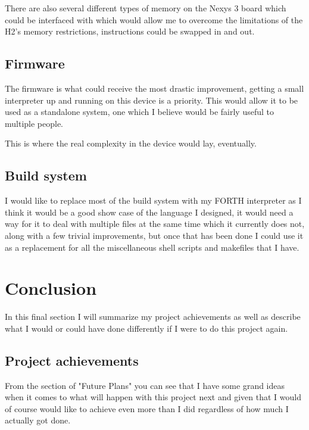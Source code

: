\documentclass	[a4paper, 10pt]	{article}
\begin{document}
      There are also several different types of memory on the Nexys 3 board
      which could be interfaced with which would allow me to overcome the
      limitations of the H2's memory restrictions, instructions could be swapped
      in and out.

    \subsection{Firmware}

    The firmware is what could receive the most drastic improvement, getting a small
    interpreter up and running on this device is a priority. This would allow it
    to be used as a standalone system, one which I believe would be fairly useful
    to multiple people. 

    This is where the real complexity in the device would lay, eventually.

    \subsection{Build system}

    I would like to replace most of the build system with my FORTH interpreter as I
    think it would be a good show case of the language I designed, it would need
    a way for it to deal with multiple files at the same time which it currently does
    not, along with a few trivial improvements, but once that has been done I could
    use it as a replacement for all the miscellaneous shell scripts and makefiles
    that I have.

  \section{Conclusion}

    In this final section I will summarize my project achievements as well as describe
    what I would or could have done differently if I were to do this project again.

    \subsection{Project achievements}

    From the section of "Future Plans" you can see that I have some grand ideas when
    it comes to what will happen with this project next and given that I would of course
    would like to achieve even more than I did regardless of how much I actually got done.
\end{document}
